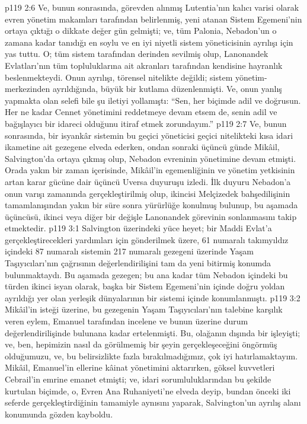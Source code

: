 \vs p119 2:6 Ve, bunun sonrasında, görevden alınmış Lutentia’nın kalıcı varisi olarak evren yönetim makamları tarafından belirlenmiş, yeni atanan Sistem Egemeni’nin ortaya çıktığı o dikkate değer gün gelmişti; ve, tüm Palonia, Nebadon’un o zamana kadar tanıdığı en soylu ve en iyi niyetli sistem yöneticisinin ayrılışı için yas tuttu. O; tüm sistem tarafından derinden sevilmiş olup, Lanonandek Evlatları’nın tüm topluluklarına ait akranları tarafından kendisine hayranlık beslenmekteydi. Onun ayrılışı, törensel nitelikte değildi; sistem yönetim\hyp{}merkezinden ayrıldığında, büyük bir kutlama düzenlenmişti. Ve, onun yanlış yapmakta olan selefi bile şu iletiyi yollamıştı: “Sen, her biçimde adil ve doğrusun. Her ne kadar Cennet yönetimini reddetmeye devam etsem de, senin adil ve bağışlayıcı bir idareci olduğunu itiraf etmek zorundayım.”
\vs p119 2:7 Ve, bunun sonrasında, bir isyankâr sistemin bu geçici yöneticisi geçici nitelikteki kısa idari ikametine ait gezegene elveda ederken, ondan sonraki üçüncü günde Mikâil, Salvington’da ortaya çıkmış olup, Nebadon evreninin yönetimine devam etmişti. Orada yakın bir zaman içerisinde, Mikâil’in egemenliğinin ve yönetim yetkisinin artan karar gücüne dair üçüncü Uversa duyuruşu izledi. İlk duyuru Nebadon’a onun varışı zamanında gerçekleştirilmiş olup, ikincisi Melçizedek bahşedilişinin tamamlanışından yakın bir süre sonra yürürlüğe konulmuş bulunup, bu aşamada üçüncüsü, ikinci veya diğer bir değişle Lanonandek görevinin sonlanmasını takip etmektedir.
\vs p119 3:1 Salvington üzerindeki yüce heyet; bir Maddi Evlat’a gerçekleştirecekleri yardımları için gönderilmek üzere, 61 numaralı takımyıldız içindeki 87 numaralı sistemin 217 numaralı gezegeni üzerinde Yaşam Taşıyıcıları’nın çağrısının değerlendirilişini tam da yeni bitirmiş konumda bulunmaktaydı. Bu aşamada gezegen; bu ana kadar tüm Nebadon içindeki bu türden ikinci isyan olarak, başka bir Sistem Egemeni’nin içinde doğru yoldan ayrıldığı yer olan yerleşik dünyalarının bir sistemi içinde konumlanmıştı.
\vs p119 3:2 Mikâil’in isteği üzerine, bu gezegenin Yaşam Taşıyıcıları’nın talebine karşılık veren eylem, Emanuel tarafından incelene ve bunun üzerine durum değerlendirilişinde bulunana kadar ertelenmişti. Bu, olağanın dışında bir işleyişti; ve, ben, hepimizin nasıl da görülmemiş bir şeyin gerçekleşeceğini öngörmüş olduğumuzu, ve, bu belirsizlikte fazla bırakılmadığımız, çok iyi hatırlamaktayım. Mikâil, Emanuel’in ellerine kâinat yönetimini aktarırken, göksel kuvvetleri Cebrail’in emrine emanet etmişti; ve, idari sorumluluklarından bu şekilde kurtulan biçimde, o, Evren Ana Ruhaniyeti’ne elveda deyip, bundan önceki iki seferde gerçekleştirdiğinin tamamiyle aynısını yaparak, Salvington’un ayrılış alanı konumunda gözden kayboldu.
